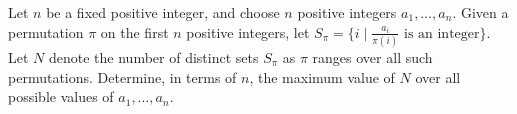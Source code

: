 Let $n$ be a fixed positive integer, and choose $n$ positive integers $a_1, \ldots , a_n$. Given a permutation $\pi$ on the first $n$ positive integers, let $S_{\pi}=\{i\mid \frac{a_i}{\pi(i)} \text{ is an integer}\}$. Let $N$ denote the number of distinct sets $S_{\pi}$ as $\pi$ ranges over all such permutations. Determine, in terms of $n$,  the maximum value of $N$ over all possible values of $a_1, \ldots , a_n$.